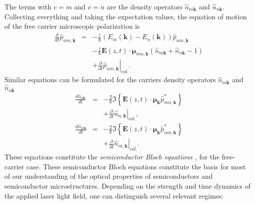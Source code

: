 The terms with $c=m$ and $v=n$ are the density operators $\hat{n}_{m\mathbf{k}}$
and $\hat{n}_{n\mathbf{k}}$. Collecting everything and taking the
expectation values, the equation of motion of the free carrier microscopic
polarization is\begin{eqnarray}
\frac{d}{dt}\hat{p}_{nm,\mathbf{k}} & = & -\frac{i}{\hbar}\left(E_{m}(\mathbf{k})-E_{n}(\mathbf{k})\right)\hat{p}_{nm,\mathbf{k}}\nonumber \\
 &  & -\frac{i}{\hbar}\mathbf{E}(z,t)\cdot\boldsymbol{\mu}_{mn,\mathbf{k}}\left(\hat{n}_{m\mathbf{k}}+\hat{n}_{n\mathbf{k}}-1\right)\nonumber \\
 &  & +\left.\frac{\partial}{\partial t}\hat{p}_{nm,\mathbf{k}}\right|_{col.}.\label{eq:SC_Bloch_Eq_1}\end{eqnarray}
Similar equations can be formulated for the carriers density operators
$\hat{n}_{m\mathbf{k}}$ and $\hat{n}_{n\mathbf{k}}$\begin{eqnarray}
\frac{d\hat{n}_{n\mathbf{k}}}{dt} & = & -\frac{2}{\hbar}\Im\left\{ \mathbf{E}(z,t)\cdot\boldsymbol{\mu}_{\mathbf{k}}\hat{p}_{nm,\mathbf{k}}^{*}\right\} \nonumber \\
 &  & +\left.\frac{\partial}{\partial t}\hat{n}_{n,\mathbf{k}}\right|_{col.},\label{eq:SC_Bloch_Eq_2}\\
\frac{d\hat{n}_{m\mathbf{k}}}{dt} & = & -\frac{2}{\hbar}\Im\left\{ \mathbf{E}(z,t)\cdot\boldsymbol{\mu}_{\mathbf{k}}\hat{p}_{nm,\mathbf{k}}^{*}\right\} \nonumber \\
 &  & +\left.\frac{\partial}{\partial t}\hat{n}_{m,\mathbf{k}}\right|_{col.}.\label{eq:SC_Bloch_Eq_3}\end{eqnarray}
These equations constitute the\emph{ semiconductor Bloch equations
\citet{Haug2009},} for the free-carrier case. These semiconductor
Bloch equations constitute the basis for most of our understanding
of the optical properties of semiconductors and semiconductor microstructures.
Depending on the strength and time dynamics of the applied laser light
field, one can distinguish several relevant regimes: 
